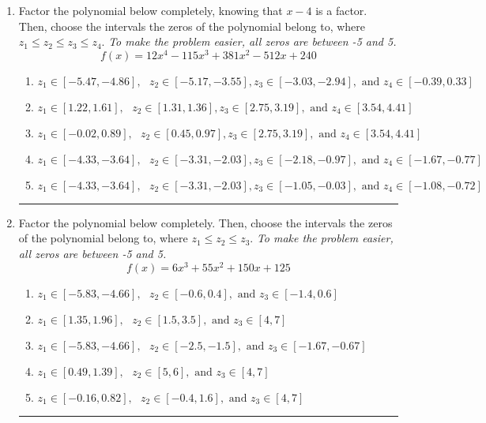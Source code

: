 \documentclass[14pt]{extbook}
\newcommand{\litem}[1]{\item#1\hspace*{-1cm}\rule{\textwidth}{0.4pt}}
\begin{document}
\begin{enumerate}
{\begin{enumerate}[label=\Alph*.]
\end{enumerate} }
\litem{
Factor the polynomial below completely, knowing that $x-4$ is a factor. Then, choose the intervals the zeros of the polynomial belong to, where $z_1 \leq z_2 \leq z_3 \leq z_4$. \textit{To make the problem easier, all zeros are between -5 and 5.}\[ f(x) = 12x^{4} -115 x^{3} +381 x^{2} -512 x + 240 \]\begin{enumerate}[label=\Alph*.]
\item \( z_1 \in [-5.47, -4.86], \text{   }  z_2 \in [-5.17, -3.55], z_3 \in [-3.03, -2.94], \text{   and   } z_4 \in [-0.39, 0.33] \)
\item \( z_1 \in [1.22, 1.61], \text{   }  z_2 \in [1.31, 1.36], z_3 \in [2.75, 3.19], \text{   and   } z_4 \in [3.54, 4.41] \)
\item \( z_1 \in [-0.02, 0.89], \text{   }  z_2 \in [0.45, 0.97], z_3 \in [2.75, 3.19], \text{   and   } z_4 \in [3.54, 4.41] \)
\item \( z_1 \in [-4.33, -3.64], \text{   }  z_2 \in [-3.31, -2.03], z_3 \in [-2.18, -0.97], \text{   and   } z_4 \in [-1.67, -0.77] \)
\item \( z_1 \in [-4.33, -3.64], \text{   }  z_2 \in [-3.31, -2.03], z_3 \in [-1.05, -0.03], \text{   and   } z_4 \in [-1.08, -0.72] \)

\end{enumerate} }
\litem{
Factor the polynomial below completely. Then, choose the intervals the zeros of the polynomial belong to, where $z_1 \leq z_2 \leq z_3$. \textit{To make the problem easier, all zeros are between -5 and 5.}\[ f(x) = 6x^{3} +55 x^{2} +150 x + 125 \]\begin{enumerate}[label=\Alph*.]
\item \( z_1 \in [-5.83, -4.66], \text{   }  z_2 \in [-0.6, 0.4], \text{   and   } z_3 \in [-1.4, 0.6] \)
\item \( z_1 \in [1.35, 1.96], \text{   }  z_2 \in [1.5, 3.5], \text{   and   } z_3 \in [4, 7] \)
\item \( z_1 \in [-5.83, -4.66], \text{   }  z_2 \in [-2.5, -1.5], \text{   and   } z_3 \in [-1.67, -0.67] \)
\item \( z_1 \in [0.49, 1.39], \text{   }  z_2 \in [5, 6], \text{   and   } z_3 \in [4, 7] \)
\item \( z_1 \in [-0.16, 0.82], \text{   }  z_2 \in [-0.4, 1.6], \text{   and   } z_3 \in [4, 7] \)


\end{enumerate}}
\end{enumerate}
\end{document}
